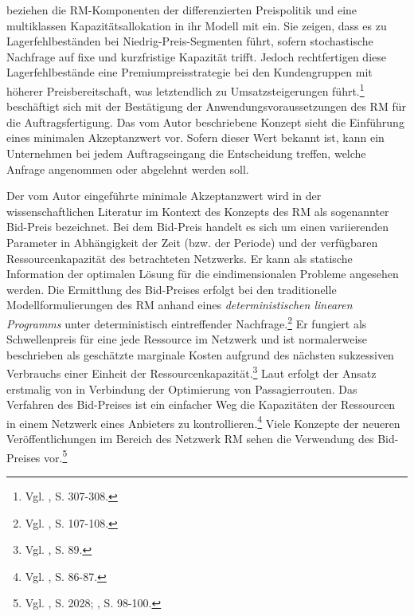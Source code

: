 \cite{deBHarris1995299} beziehen die RM-Komponenten der differenzierten Preispolitik und eine multiklassen Kapazitätsallokation in ihr Modell mit ein. Sie zeigen, dass es zu Lagerfehlbeständen bei Niedrig-Preis-Segmenten führt, sofern stochastische Nachfrage auf fixe und kurzfristige Kapazität trifft. Jedoch rechtfertigen diese Lagerfehlbestände eine Premiumpreisstrategie bei den Kundengruppen mit höherer Preisbereitschaft, was letztendlich zu Umsatzsteigerungen führt.\footnote{Vgl. \cite{deBHarris1995299}, S. 307-308.} \cite{Kalyan:2002aa} beschäftigt sich mit der Bestätigung der Anwendungsvoraussetzungen des RM für die Auftragsfertigung. Das vom Autor beschriebene Konzept sieht die Einführung eines minimalen Akzeptanzwert vor. Sofern dieser Wert bekannt ist, kann ein Unternehmen bei jedem Auftragseingang die Entscheidung treffen, welche Anfrage angenommen oder abgelehnt werden soll.

Der vom Autor \cite{Kalyan:2002aa} eingeführte minimale Akzeptanzwert wird in der wissenschaftlichen Literatur im Kontext des Konzepts des RM als sogenannter Bid-Preis bezeichnet. Bei dem Bid-Preis handelt es sich um einen variierenden Parameter in Abhängigkeit der Zeit (bzw. der Periode) und der verfügbaren Ressourcenkapazität des betrachteten Netzwerks. Er kann als statische Information der optimalen Lösung für die eindimensionalen Probleme angesehen werden. Die Ermittlung des Bid-Preises erfolgt bei den traditionelle Modellformulierungen des RM anhand eines \textit{deterministischen linearen Programms} unter deterministisch eintreffender Nachfrage.\footnote{Vgl. \cite{talluri2004revenue}, S. 107-108.} %
Er fungiert als Schwellenpreis für eine jede Ressource im Netzwerk und ist normalerweise beschrieben als geschätzte marginale Kosten aufgrund des nächsten sukzessiven Verbrauchs einer Einheit der Ressourcenkapazität.\footnote{Vgl. \cite{talluri2004theory}, S. 89.} Laut \cite{gonsch2013using} erfolgt der Ansatz erstmalig von \cite{talluri2001airline} in Verbindung der Optimierung von Passagierrouten. Das Verfahren des Bid-Preises ist ein einfacher Weg die Kapazitäten der Ressourcen in einem Netzwerk eines Anbieters zu kontrollieren.\footnote{Vgl. \cite{talluri2004theory}, S. 86-87\label{RMH}.} Viele Konzepte der neueren Veröffentlichungen im Bereich des Netzwerk RM sehen die Verwendung des Bid-Preises vor.\footnote{Vgl. \cite{petrick2010dynamic}, S. 2028; \cite{gonsch2013using}, S. 98-100.}


